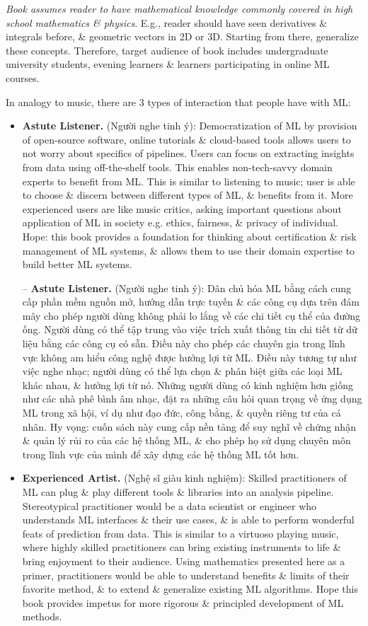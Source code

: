 \documentclass{article}
\begin{document}
\begin{enumerate}
\begin{itemize}
		{\it Book assumes reader to have mathematical knowledge commonly covered in high school mathematics \& physics}. E.g., reader should have seen derivatives \& integrals before, \& geometric vectors in 2D or 3D. Starting from there, generalize these concepts. Therefore, target audience of book includes undergraduate university students, evening learners \& learners participating in online ML courses.
		
		In analogy to music, there are 3 types of interaction that people have with ML:
		\begin{itemize}
			\item {\bf Astute Listener.} (Người nghe tinh ý): Democratization of ML by provision of open-source software, online tutorials \& cloud-based tools allows users to not worry about specifics of pipelines. Users can focus on extracting insights from data using off-the-shelf tools. This enables non-tech-savvy domain experts to benefit from ML. This is similar to listening to music; user is able to choose \& discern between different types of ML, \& benefits from it. More experienced users are like music critics, asking important questions about application of ML in society e.g. ethics, fairness, \& privacy of individual. Hope: this book provides a foundation for thinking about certification \& risk management of ML systems, \& allows them to use their domain expertise to build better ML systems.
			
			-- {\bf Astute Listener.} (Người nghe tinh ý): Dân chủ hóa ML bằng cách cung cấp phần mềm nguồn mở, hướng dẫn trực tuyến \& các công cụ dựa trên đám mây cho phép người dùng không phải lo lắng về các chi tiết cụ thể của đường ống. Người dùng có thể tập trung vào việc trích xuất thông tin chi tiết từ dữ liệu bằng các công cụ có sẵn. Điều này cho phép các chuyên gia trong lĩnh vực không am hiểu công nghệ được hưởng lợi từ ML. Điều này tương tự như việc nghe nhạc; người dùng có thể lựa chọn \& phân biệt giữa các loại ML khác nhau, \& hưởng lợi từ nó. Những người dùng có kinh nghiệm hơn giống như các nhà phê bình âm nhạc, đặt ra những câu hỏi quan trọng về ứng dụng ML trong xã hội, ví dụ như đạo đức, công bằng, \& quyền riêng tư của cá nhân. Hy vọng: cuốn sách này cung cấp nền tảng để suy nghĩ về chứng nhận \& quản lý rủi ro của các hệ thống ML, \& cho phép họ sử dụng chuyên môn trong lĩnh vực của mình để xây dựng các hệ thống ML tốt hơn.
			\item {\bf Experienced Artist.} (Nghệ sĩ giàu kinh nghiệm): Skilled practitioners of ML can plug \& play different tools \& libraries into an analysis pipeline. Stereotypical practitioner would be a data scientist or engineer who understands ML interfaces \& their use cases, \& is able to perform wonderful feats of prediction from data. This is similar to a virtuoso playing music, where highly skilled practitioners can bring existing instruments to life \& bring enjoyment to their audience. Using mathematics presented here as a primer, practitioners would be able to understand benefits \& limits of their favorite method, \& to extend \& generalize existing ML algorithms. Hope this book provides impetus for more rigorous \& principled development of ML methods.
			

\end{itemize}
\end{itemize}
\end{enumerate}
\end{document}
